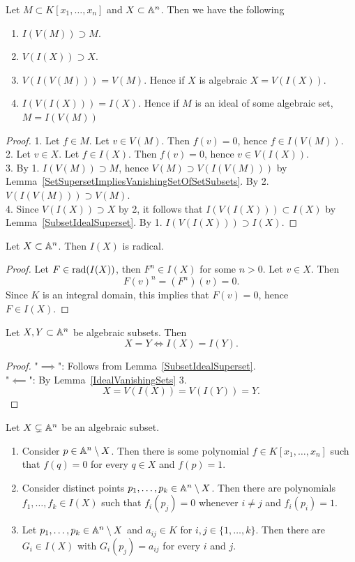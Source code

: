 \begin{lemma}\label{IdealVanishingSets}
    Let $M \subset K[x_1,\dots,x_n]$ and $X\subset \mathbb{A}^n$. Then we have the following
    \begin{enumerate}
        \item $I(V(M)) \supset M$.
        \item $V(I(X)) \supset X$.
        \item $V(I(V(M)))=V(M)$. Hence if $X$ is algebraic $X=V(I(X))$.
        \item $I(V(I(X)))=I(X)$. Hence if $M$ is an ideal of some algebraic set, $M= I(V(M))$
    \end{enumerate}
\end{lemma}
\begin{proof}
    1. Let $f\in M$. Let $v\in V(M)$. Then $f(v) = 0$, hence $f\in I(V(M))$.\\
    2. Let $v \in X$. Let $f\in I(X)$. Then $f(v)=0$, hence $v\in V(I(X))$.\\
    3. By 1. $I(V(M)) \supset M$, hence $V(M)\supset V(I(V(M)))$ by Lemma~\ref{SetSupersetImpliesVanishingSetOfSetSubsets}. By 2. $V(I(V(M))) \supset V(M)$.\\
    4. Since $V(I(X))\supset X$ by 2, it follows that $I(V(I(X)))\subset I(X)$ by Lemma~\ref{SubsetIdealSuperset}. By 1. $I(V(I(X)))\supset I(X)$.
\end{proof}
\begin{lemma}
    Let $X\subset \mathbb{A}^n$. Then $I(X)$ is radical. 
\end{lemma}
\begin{proof}
    Let $F\in \mathrm{rad}(I(X))$, then $F^n \in I(X)$ for some $n>0$. Let $v\in X$. Then $$F(v)^n=\left(F^n\right)(v)=0.$$ 
    Since $K$ is an integral domain, this implies that $F(v)=0$, hence\\ $F\in I(X)$.
\end{proof}
\begin{lemma}\label{I(.)IsInjective}
    Let $X,Y\subset \mathbb{A}^n$ be algebraic subsets. Then 
    $$X=Y \iff I(X) = I(Y).$$ 
\end{lemma}
\begin{proof}
    "$\implies$": Follows from Lemma~\ref{SubsetIdealSuperset}.\\
    "$\impliedby$": By Lemma~\ref{IdealVanishingSets} 3. 
    $$X = V(I(X))=V(I(Y))=Y.$$
\end{proof}
\begin{corollary}\label{KroneckerPolynomial}
    Let $X\subsetneq \mathbb{A}^n$ be an algebraic subset.
    \begin{enumerate}
        \item Consider $p\in \mathbb{A}^n\setminus X$. Then there is some polynomial $f\in K[x_1,\dots,x_n]$ such that $f(q) = 0$ for every $q\in X$ and $f(p)=1$.
        \item Consider distinct points $p_1,\dots,p_k\in \mathbb{A}^n\setminus X$. Then there are polynomials $f_1,\dots,f_k\in I(X)$ such that $f_i(p_j)=0$ whenever $i\neq j$ and $f_i(p_i)=1$.
        \item  Let $p_1,\dots,p_k\in \mathbb{A}^n\setminus X$ and $a_{ij}\in K$ for $i,j\in\{1,\dots,k\}$. Then there are $G_i\in I(X)$ with $G_i(p_j) = a_{ij}$  for every $i$ and $j$. 
    \end{enumerate}
\end{corollary}
